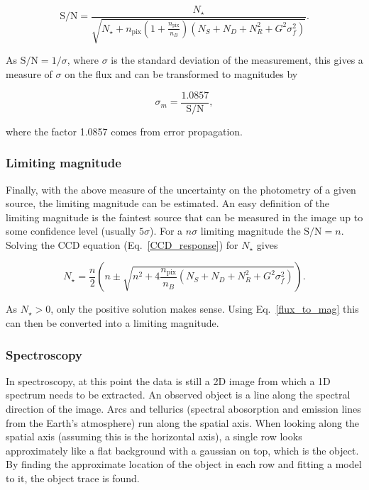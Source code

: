 \documentclass[a4paper,oneside,12pt, class=Latex/Classes/PhDthesisPSnPDF, crop=false]{standalone}
\begin{document}
\begin{equation}
    \text{S/N} = \frac{N_\star}{\sqrt{N_\star + n_\text{pix}\left(1+\frac{n_\text{pix}}{n_B}\right)\left(N_S + N_D + N_R^2 + G^2\sigma_f^2\right)}}.
    \label{CCD_eq}
\end{equation}

As $\text{S/N}=1/\sigma$, where $\sigma$ is the standard deviation of the measurement, this gives a measure of $\sigma$ on the flux and can be transformed to magnitudes by{}

\begin{equation}
    \sigma_m = \frac{1.0857}{\text{S/N}},
\end{equation}

where the factor 1.0857 comes from error propagation.

\subsubsection*{Limiting magnitude}
Finally, with the above measure of the uncertainty on the photometry of a given source, the limiting magnitude can be estimated. An easy definition of the limiting magnitude is the faintest source that can be measured in the image up to some confidence level (usually $5\sigma$). For a $n\sigma$ limiting magnitude the $\text{S/N} = n$. Solving the CCD equation (Eq.~\ref{CCD_response}) for $N_\star$ gives

\begin{equation}
    N_\star = \frac{n}{2}\left(n\pm\sqrt{n^2 + 4\frac{n_\text{pix}}{n_B}\left(N_S + N_D + N_R^2 + G^2\sigma_f^2\right)}\right).
\end{equation}

As $N_\star > 0$, only the positive solution makes sense. Using Eq.~\ref{flux_to_mag} this can then be converted into a limiting magnitude.


\subsubsection{Spectroscopy}
In spectroscopy, at this point the data is still a 2D image from which a 1D spectrum needs to be extracted. An observed object is a line along the spectral direction of the image. Arcs and tellurics (spectral abosorption and emission lines from the Earth's atmosphere) run along the spatial axis. When looking along the spatial axis (assuming this is the horizontal axis), a single row looks approximately like a flat background with a gaussian on top, which is the object. By finding the approximate location of the object in each row and fitting a model to it, the object trace is found.
\end{document}

